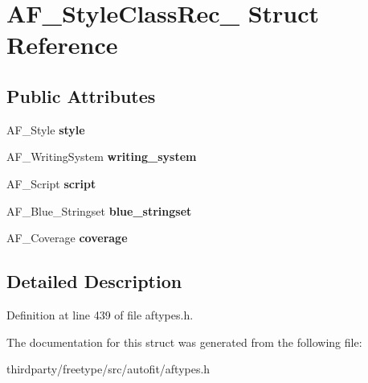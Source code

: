 \hypertarget{struct_a_f___style_class_rec__}{}\section{A\+F\+\_\+\+Style\+Class\+Rec\+\_\+ Struct Reference}
\label{struct_a_f___style_class_rec__}
\subsection*{Public Attributes}
\begin{DoxyCompactItemize}
\item 
\mbox{\label{struct_a_f___style_class_rec___a997af39782d7ae98c2a2a373e82bdb49}} 
A\+F\+\_\+\+Style {\bfseries style}
\item 
\mbox{\label{struct_a_f___style_class_rec___a3c99cf55e4d14ff39a1968334cedf1fd}} 
A\+F\+\_\+\+Writing\+System {\bfseries writing\+\_\+system}
\item 
\mbox{\label{struct_a_f___style_class_rec___aec463d3f68fc4527b4bac995cad163a4}} 
A\+F\+\_\+\+Script {\bfseries script}
\item 
\mbox{\label{struct_a_f___style_class_rec___af5081404784bd042f0447d727c6ab797}} 
A\+F\+\_\+\+Blue\+\_\+\+Stringset {\bfseries blue\+\_\+stringset}
\item 
\mbox{\label{struct_a_f___style_class_rec___afe1c209b36afa51c46c365ad3309cc06}} 
A\+F\+\_\+\+Coverage {\bfseries coverage}
\end{DoxyCompactItemize}


\subsection{Detailed Description}


Definition at line 439 of file aftypes.\+h.



The documentation for this struct was generated from the following file\+:\begin{DoxyCompactItemize}
\item 
thirdparty/freetype/src/autofit/aftypes.\+h\end{DoxyCompactItemize}
